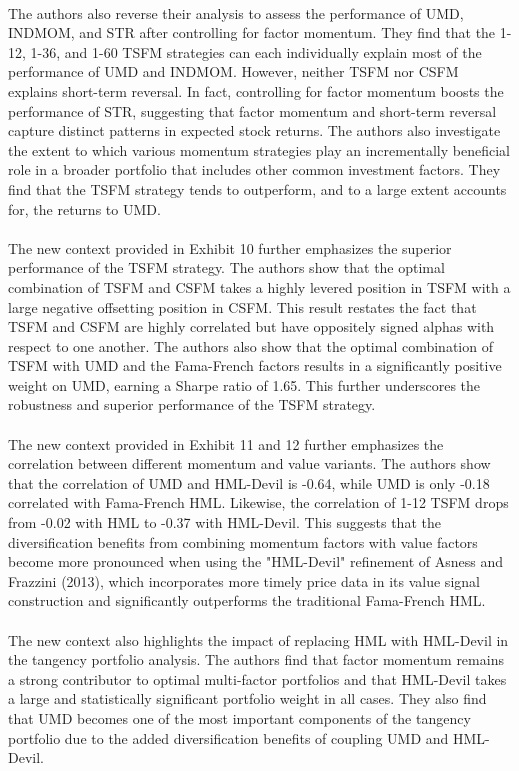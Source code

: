 \documentclass{article}
\begin{document}
\\
The authors also reverse their analysis to assess the performance of UMD, INDMOM, and STR after controlling for factor momentum. They find that the 1-12, 1-36, and 1-60 TSFM strategies can each individually explain most of the performance of UMD and INDMOM. However, neither TSFM nor CSFM explains short-term reversal. In fact, controlling for factor momentum boosts the performance of STR, suggesting that factor momentum and short-term reversal capture distinct patterns in expected stock returns. The authors also investigate the extent to which various momentum strategies play an incrementally beneficial role in a broader portfolio that includes other common investment factors. They find that the TSFM strategy tends to outperform, and to a large extent accounts for, the returns to UMD. \\
\\
The new context provided in Exhibit 10 further emphasizes the superior performance of the TSFM strategy. The authors show that the optimal combination of TSFM and CSFM takes a highly levered position in TSFM with a large negative offsetting position in CSFM. This result restates the fact that TSFM and CSFM are highly correlated but have oppositely signed alphas with respect to one another. The authors also show that the optimal combination of TSFM with UMD and the Fama-French factors results in a significantly positive weight on UMD, earning a Sharpe ratio of 1.65. This further underscores the robustness and superior performance of the TSFM strategy. \\
\\
The new context provided in Exhibit 11 and 12 further emphasizes the correlation between different momentum and value variants. The authors show that the correlation of UMD and HML-Devil is -0.64, while UMD is only -0.18 correlated with Fama-French HML. Likewise, the correlation of 1-12 TSFM drops from -0.02 with HML to -0.37 with HML-Devil. This suggests that the diversification benefits from combining momentum factors with value factors become more pronounced when using the "HML-Devil" refinement of Asness and Frazzini (2013), which incorporates more timely price data in its value signal construction and significantly outperforms the traditional Fama-French HML. \\
\\
The new context also highlights the impact of replacing HML with HML-Devil in the tangency portfolio analysis. The authors find that factor momentum remains a strong contributor to optimal multi-factor portfolios and that HML-Devil takes a large and statistically significant portfolio weight in all cases. They also find that UMD becomes one of the most important components of the tangency portfolio due to the added diversification benefits of coupling UMD and HML-Devil.  \\
\end{document}
